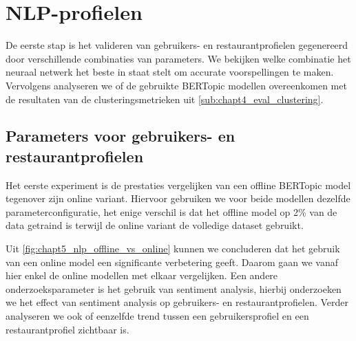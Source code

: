 \section{NLP-profielen}
\label{sub:chapt5_nlp_resultaten}
De eerste stap is het valideren van gebruikers- en restaurantprofielen gegenereerd door verschillende combinaties van parameters. We bekijken welke combinatie het neuraal netwerk het beste in staat stelt om accurate voorspellingen te maken. Vervolgens analyseren we of de gebruikte BERTopic modellen overeenkomen met de resultaten van de clusteringsmetrieken uit \autoref{sub:chapt4_eval_clustering}.


\subsection{Parameters voor gebruikers- en restaurantprofielen}
\label{sub:chapt5_vergelijking_profielen}
Het eerste experiment is de prestaties vergelijken van een offline BERTopic model tegenover zijn online variant. Hiervoor gebruiken we voor beide modellen dezelfde parameterconfiguratie, het enige verschil is dat het offline model op 2\% van de data getraind is terwijl de online variant de volledige dataset gebruikt. %


Uit \autoref{fig:chapt5_nlp_offline_vs_online} kunnen we concluderen dat het gebruik van een online model een significante verbetering geeft. Daarom gaan we vanaf hier enkel de online modellen met elkaar vergelijken. Een andere onderzoeksparameter is het gebruik van sentiment analysis, hierbij onderzoeken we het effect van sentiment analysis op gebruikers- en restaurantprofielen. Verder analyseren we ook of eenzelfde trend tussen een gebruikersprofiel en een restaurantprofiel zichtbaar is.

